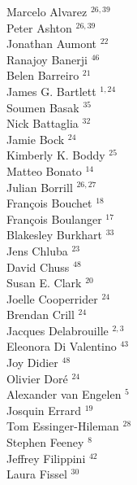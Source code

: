 \documentclass[PICOReport.tex]{subfiles}
\begin{document}
\footnotesize {

\begin{multicols}{4}
Marcelo Alvarez $^{26,39}$                 \\
Peter Ashton $^{26,39}$                    \\
Jonathan Aumont $^{22}$                 \\
Ranajoy Banerji $^{46}$                 \\
Belen Barreiro $^{21}$                  \\
James G. Bartlett $^{1,24}$               \\
Soumen Basak $^{35}$                    \\
Nick Battaglia $^{32}$                  \\
Jamie Bock $^{24}$                      \\
Kimberly K. Boddy $^{25}$               \\
Matteo Bonato $^{14}$                   \\
Julian Borrill $^{26,27}$                  \\
Fran\c{c}ois Bouchet $^{18}$            \\
Fran\c{c}ois Boulanger $^{17}$          \\
Blakesley Burkhart $^{33}$              \\
Jens Chluba $^{23}$                     \\
David Chuss $^{48}$                     \\
Susan E. Clark $^{20}$                  \\
Joelle Cooperrider $^{24}$              \\
Brendan Crill $^{24}$                   \\
Jacques Delabrouille $^{2,3}$            \\
Eleonora Di Valentino $^{43}$           \\
Joy Didier $^{48}$                      \\
Olivier Dor\'e $^{24}$                  \\
Alexander van Engelen $^{5}$           \\
Josquin Errard $^{19}$                  \\
Tom Essinger-Hileman $^{28}$            \\
Stephen Feeney $^{8}$                  \\
Jeffrey Filippini $^{42}$               \\
Laura Fissel $^{30}$                    \\

\end{multicols}}
\end{document}
